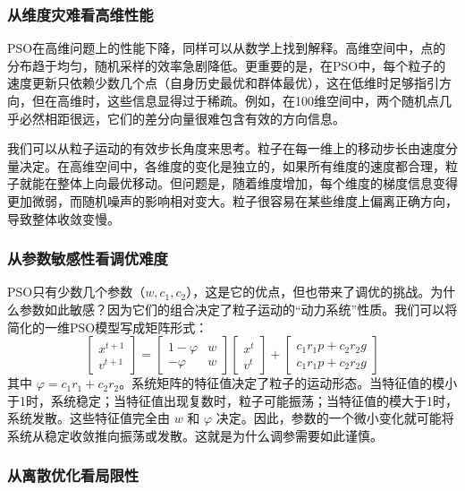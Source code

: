 \documentclass[lang=cn,zihao=-4,a4paper,fontset=windows]{beautybook}
\begin{document}
\subsubsection{从维度灾难看高维性能}

PSO在高维问题上的性能下降，同样可以从数学上找到解释。高维空间中，点的分布趋于均匀，随机采样的效率急剧降低。更重要的是，在PSO中，每个粒子的速度更新只依赖少数几个点（自身历史最优和群体最优），这在低维时足够指引方向，但在高维时，这些信息显得过于稀疏。例如，在100维空间中，两个随机点几乎必然相距很远，它们的差分向量很难包含有效的方向信息。

我们可以从粒子运动的有效步长角度来思考。粒子在每一维上的移动步长由速度分量决定。在高维空间中，各维度的变化是独立的，如果所有维度的速度都合理，粒子就能在整体上向最优移动。但问题是，随着维度增加，每个维度的梯度信息变得更加微弱，而随机噪声的影响相对变大。粒子很容易在某些维度上偏离正确方向，导致整体收敛变慢。

\subsubsection{从参数敏感性看调优难度}

PSO只有少数几个参数（\( w, c_1, c_2 \)），这是它的优点，但也带来了调优的挑战。为什么参数如此敏感？因为它们的组合决定了粒子运动的“动力系统”性质。我们可以将简化的一维PSO模型写成矩阵形式：
\[
\begin{bmatrix}
x^{t+1} \\ v^{t+1}
\end{bmatrix}
=
\begin{bmatrix}
1 - \varphi & w \\
-\varphi & w
\end{bmatrix}
\begin{bmatrix}
x^t \\ v^t
\end{bmatrix}
+
\begin{bmatrix}
c_1 r_1 p + c_2 r_2 g \\
c_1 r_1 p + c_2 r_2 g
\end{bmatrix}
\]
其中 \(\varphi = c_1 r_1 + c_2 r_2\)。系统矩阵的特征值决定了粒子的运动形态。当特征值的模小于1时，系统稳定；当特征值出现复数时，粒子可能振荡；当特征值的模大于1时，系统发散。这些特征值完全由 \( w \) 和 \(\varphi\) 决定。因此，参数的一个微小变化就可能将系统从稳定收敛推向振荡或发散。这就是为什么调参需要如此谨慎。

\subsubsection{从离散优化看局限性}
\end{document}
